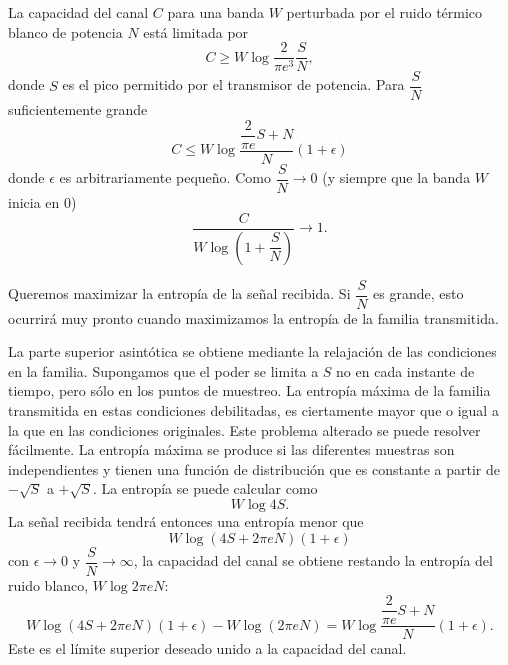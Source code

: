 \begin{theorem}
  La capacidad del canal $C$ para una banda $W$ perturbada por el
  ruido t\'ermico blanco de potencia $N$ est\'a limitada por
  \begin{equation}
    C \ge W \log \dfrac{2}{\pi e^3} \dfrac{S}{N},
  \end{equation}
  donde $S$ es el pico permitido por el transmisor de potencia. Para
  $\dfrac{S}{N}$ suficientemente grande
  \begin{equation}
    C \le W \log \dfrac{\dfrac{2}{\pi e} S + N}{N} (1 + \epsilon)
  \end{equation}
  donde $\epsilon$ es arbitrariamente peque\~no. Como
  $\dfrac{S}{N} \to 0$ (y siempre que la banda $W$ inicia en 0)
  \begin{equation}
    \frac{C}{W \log \left(1 + \dfrac{S}{N} \right)} \to 1.
  \end{equation}
\end{theorem}

Queremos maximizar la entrop\'ia de la se\~nal recibida. Si
$\dfrac{S}{N}$ es grande, esto ocurrir\'a muy pronto cuando
maximizamos la entrop\'ia de la familia transmitida.

La parte superior asint\'otica se obtiene mediante la relajaci\'on de
las condiciones en la familia. Supongamos que el poder se limita a
$S$ no en cada instante de tiempo, pero s\'olo en los puntos de
muestreo. La entrop\'ia m\'axima de la familia transmitida en estas
condiciones debilitadas, es ciertamente mayor que o igual a la que en
las condiciones originales. Este problema alterado se puede resolver
f\'acilmente. La entrop\'ia m\'axima se produce si las diferentes
muestras son independientes y tienen una funci\'on de distribuci\'on
que es constante a partir de $-\sqrt{S}$ a $+\sqrt{S}$. La entrop\'ia
se puede calcular como
\begin{equation}
  W \log 4S.
\end{equation}
La se\~nal recibida tendr\'a entonces una entrop\'ia menor que
\begin{equation}
  W \log (4S + 2 \pi eN)(1 + \epsilon)
\end{equation}
con $\epsilon \to 0$ y $\dfrac{S}{N} \to \infty$, la capacidad del
canal se obtiene restando la entrop\'ia del ruido blanco,
$W \log 2 \pi eN$:
\begin{equation}
  W \log (4S + 2 \pi eN)(1 + \epsilon) - W \log (2 \pi eN) =
  W \log \dfrac{\dfrac{2}{\pi e} S + N}{N} (1 + \epsilon).
\end{equation}
Este es el l\'imite superior deseado unido a la capacidad del canal.

